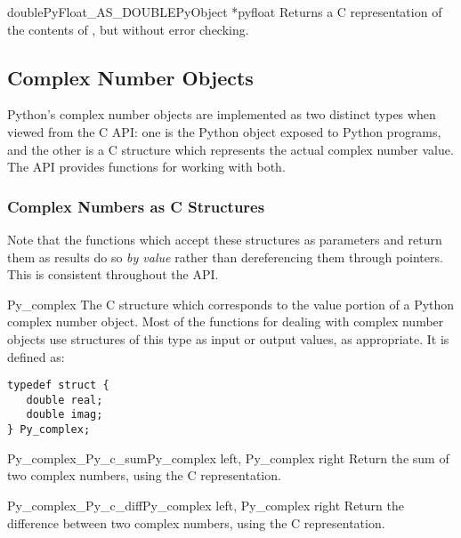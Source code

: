 \begin{cfuncdesc}{double}{PyFloat_AS_DOUBLE}{PyObject *pyfloat}
  Returns a C  representation of the contents of
  , but without error checking.
\end{cfuncdesc}


\subsection{Complex Number Objects \label{complexObjects}}

Python's complex number objects are implemented as two distinct types
when viewed from the C API:  one is the Python object exposed to
Python programs, and the other is a C structure which represents the
actual complex number value.  The API provides functions for working
with both.

\subsubsection{Complex Numbers as C Structures}

Note that the functions which accept these structures as parameters
and return them as results do so \emph{by value} rather than
dereferencing them through pointers.  This is consistent throughout
the API.

\begin{ctypedesc}{Py_complex}
  The C structure which corresponds to the value portion of a Python
  complex number object.  Most of the functions for dealing with
  complex number objects use structures of this type as input or
  output values, as appropriate.  It is defined as:

\begin{verbatim}
typedef struct {
   double real;
   double imag;
} Py_complex;
\end{verbatim}
\end{ctypedesc}

\begin{cfuncdesc}{Py_complex}{_Py_c_sum}{Py_complex left, Py_complex right}
  Return the sum of two complex numbers, using the C
   representation.
\end{cfuncdesc}

\begin{cfuncdesc}{Py_complex}{_Py_c_diff}{Py_complex left, Py_complex right}
  Return the difference between two complex numbers, using the C
   representation.
\end{cfuncdesc}

